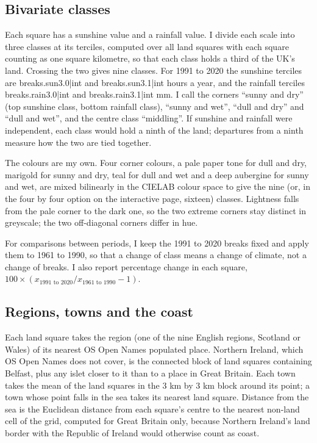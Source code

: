 \documentclass[11pt,a4paper]{article}
\begin{document}
\subsection{Bivariate classes}

Each square has a sunshine value and a rainfall value. I divide each scale into three classes at its terciles, computed over all land squares with each square counting as one square kilometre, so that each class holds a third of the UK's land. Crossing the two gives nine classes. For 1991 to 2020 the sunshine terciles are {{breaks.sun3.0|int}} and {{breaks.sun3.1|int}} hours a year, and the rainfall terciles {{breaks.rain3.0|int}} and {{breaks.rain3.1|int}} mm. I call the corners ``sunny and dry'' (top sunshine class, bottom rainfall class), ``sunny and wet'', ``dull and dry'' and ``dull and wet'', and the centre class ``middling''. If sunshine and rainfall were independent, each class would hold a ninth of the land; departures from a ninth measure how the two are tied together.

The colours are my own. Four corner colours, a pale paper tone for dull and dry, marigold for sunny and dry, teal for dull and wet and a deep aubergine for sunny and wet, are mixed bilinearly in the CIELAB colour space to give the nine (or, in the four by four option on the interactive page, sixteen) classes. Lightness falls from the pale corner to the dark one, so the two extreme corners stay distinct in greyscale; the two off-diagonal corners differ in hue.

For comparisons between periods, I keep the 1991 to 2020 breaks fixed and apply them to 1961 to 1990, so that a change of class means a change of climate, not a change of breaks. I also report percentage change in each square, $100 \times (x_{1991\text{ to }2020}/x_{1961\text{ to }1990} - 1)$.

\subsection{Regions, towns and the coast}

Each land square takes the region (one of the nine English regions, Scotland or Wales) of its nearest OS Open Names populated place. Northern Ireland, which OS Open Names does not cover, is the connected block of land squares containing Belfast, plus any islet closer to it than to a place in Great Britain. Each town takes the mean of the land squares in the 3 km by 3 km block around its point; a town whose point falls in the sea takes its nearest land square. Distance from the sea is the Euclidean distance from each square's centre to the nearest non-land cell of the grid, computed for Great Britain only, because Northern Ireland's land border with the Republic of Ireland would otherwise count as coast.
\end{document}
